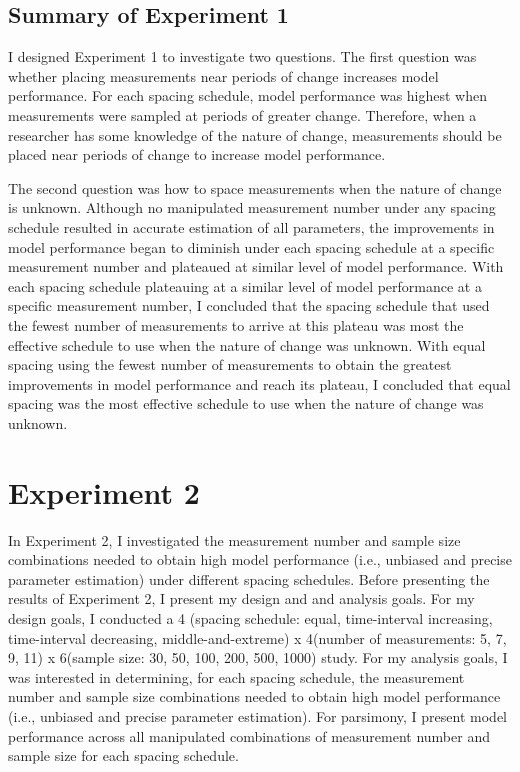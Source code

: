 \documentclass[
12pt, %
twoside,
english]{guelphthesis}
\begin{document}
\hypertarget{summary-of-experiment-1}{%
\section{Summary of Experiment 1}\label{summary-of-experiment-1}}

I designed Experiment 1 to investigate two questions. The first question was whether placing measurements near periods of change increases model performance. For each spacing schedule, model performance was highest when measurements were sampled at periods of greater change. Therefore, when a researcher has some knowledge of the nature of change, measurements should be placed near periods of change to increase model performance.

The second question was how to space measurements when the nature of change is unknown. Although no manipulated measurement number under any spacing schedule resulted in accurate estimation of all parameters, the improvements in model performance began to diminish under each spacing schedule at a specific measurement number and plateaued at similar level of model performance. With each spacing schedule plateauing at a similar level of model performance at a specific measurement number, I concluded that the spacing schedule that used the fewest number of measurements to arrive at this plateau was most the effective schedule to use when the nature of change was unknown. With equal spacing using the fewest number of measurements to obtain the greatest improvements in model performance and reach its plateau, I concluded that equal spacing was the most effective schedule to use when the nature of change was unknown.

\hypertarget{Exp2}{%
\chapter{Experiment 2}\label{Exp2}}

In Experiment 2, I investigated the measurement number and sample size combinations needed to obtain high model performance (i.e., unbiased and precise parameter estimation) under different spacing schedules. Before presenting the results of Experiment 2, I present my design and and analysis goals. For my design goals, I conducted a 4 (spacing schedule: equal, time-interval increasing, time-interval decreasing, middle-and-extreme) x 4(number of measurements: 5, 7, 9, 11) x 6(sample size: 30, 50, 100, 200, 500, 1000) study. For my analysis goals, I was interested in determining, for each spacing schedule, the measurement number and sample size combinations needed to obtain high model performance (i.e., unbiased and precise parameter estimation). For parsimony, I present model performance across all manipulated combinations of measurement number and sample size for each spacing schedule.
\end{document}
